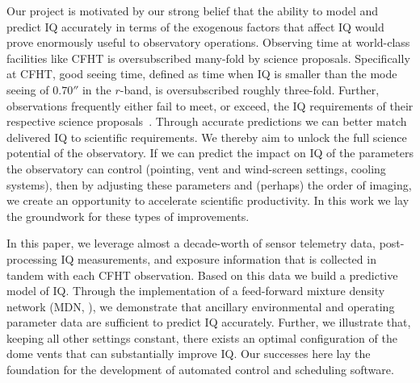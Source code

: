 Our project is motivated by our strong belief that the ability to model and predict IQ accurately in terms of the exogenous factors that affect IQ would prove enormously useful to observatory operations.  Observing time at world-class facilities like CFHT is oversubscribed many-fold by science proposals. Specifically at CFHT, good seeing time, defined as time when IQ is smaller than the mode seeing of $0.70''$ in the $r$-band, is oversubscribed roughly three-fold. Further, observations frequently either fail to meet, or exceed, the IQ requirements of their respective science proposals~\citep{milli2019nowcasting_paramal}. Through accurate predictions we can better match delivered IQ to scientific requirements.  We thereby aim to unlock the full science potential of the observatory. 
If we can predict the impact on IQ of the parameters the observatory can control (pointing, vent and wind-screen settings, cooling systems), then by adjusting these parameters and (perhaps) the order of imaging, we create an opportunity to accelerate scientific productivity.  In this work we lay the groundwork for  these types of improvements.

In this paper, we leverage almost a decade-worth of sensor telemetry data, post-processing IQ measurements, and exposure information that is collected in tandem with each CFHT observation.  Based on this data we build a predictive model of IQ. Through the implementation of a feed-forward mixture density network (MDN, \citealt{bishop_mdn}), we demonstrate that ancillary environmental and operating parameter data are sufficient to predict IQ accurately. Further, we illustrate that, keeping all other settings constant, there exists an optimal configuration of the dome vents that can substantially improve IQ. Our successes here lay the foundation for the development of automated control and scheduling software. 




